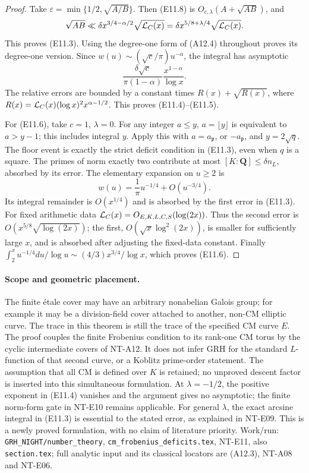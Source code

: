 \begin{proof}
Take \(\varepsilon=\min\{1/2,\sqrt{A/B}\}\).
Then (E11.8) is \(O_{c,\lambda}(A+\sqrt{AB})\), and
\[
 \sqrt{AB}\ll
          \delta x^{3/4-\alpha/2}\sqrt{{\cal L}_C(x)}
       =\delta x^{5/8+\lambda/4}\sqrt{{\cal L}_C(x)}.
 \]
This proves (E11.3). Using the degree-one form of (A12.4)
throughout proves its degree-one version.
Since \(w(u)\sim(\sqrt c/\pi)u^{-\alpha}\), the integral
has asymptotic
\[
 \frac{\delta\sqrt c}{\pi(1-\alpha)}
                          \frac{x^{1-\alpha}}{\log x}.
 \]
The relative errors are bounded by a constant times
\(R(x)+\sqrt{R(x)}\), where
\(R(x)={\cal L}_C(x)(\log x)^2x^{\alpha-1/2}\).
This proves (E11.4)--(E11.5).

For (E11.6), take \(c=1\), \(\lambda=0\). For any integer
\(a\le y\), \(a=\lfloor y\rfloor\) is equivalent to
\(a>y-1\); this includes integral \(y\).
Apply this with \(a=a_{\mathfrak p}\), or
\(-a_{\mathfrak p}\), and \(y=2\sqrt q\).
The floor event is exactly the strict deficit condition
in (E11.3), even when \(q\) is a square.
The primes of norm exactly two contribute at most
\([K:\mathbf Q]\le\delta n_L\), absorbed by its error.
The elementary expansion on \(u\ge2\) is
\[
 w(u)=\frac1\pi u^{-1/4}+O(u^{-3/4}).
 \]
Its integral remainder is \(O(x^{1/4})\) and is absorbed
by the first error in (E11.3).
For fixed arithmetic data
\({\cal L}_C(x)=O_{E,K,L,C,S}(\log(2x))\).
Thus the second error is \(O(x^{5/8}\sqrt{\log(2x)})\);
the first, \(O(\sqrt x\log^2(2x))\), is smaller for
sufficiently large \(x\), and is absorbed after adjusting
the fixed-data constant. Finally
\(\int_2^x u^{-1/4}du/\log u
 \sim(4/3)x^{3/4}/\log x\), which proves (E11.6).
\end{proof}

\paragraph{Scope and geometric placement.}
The finite étale cover may have an arbitrary nonabelian
Galois group; for example it may be a division-field
cover attached to another, non-CM elliptic curve.
The trace in this theorem is still the trace of the
specified CM curve \(E\). The proof couples the finite
Frobenius condition to its rank-one CM torus by the cyclic
intermediate covers of NT-A12. It does not infer GRH for
the standard \(L\)-function of that second curve, or a
Koblitz prime-order statement. The assumption that all
CM is defined over \(K\) is retained; no unproved descent
factor is inserted into this simultaneous formulation.
At \(\lambda=-1/2\), the positive exponent in (E11.4)
vanishes and the argument gives no asymptotic; the
finite norm-form gate in NT-E10 remains applicable.
For general \(\lambda\), the exact arcsine integral in
(E11.3) is essential to the stated error, as explained
in NT-E09. This is a newly proved formulation, with no
claim of literature priority.
Work/run: \texttt{GRH\_NIGHT/number\_theory},
\texttt{cm\_frobenius\_deficits.tex}, NT-E11, also
\texttt{section.tex}; full analytic input and its
classical locators are (A12.3), NT-A08 and NT-E06.
